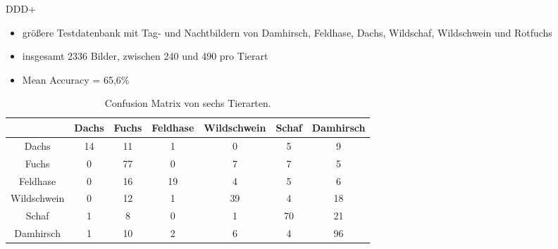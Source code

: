 \begin{frame}[t, fragile]{DDD+}
	\begin{itemize}
		\item größere Testdatenbank mit Tag- und Nachtbildern von Damhirsch, Feldhase, Dachs, Wildschaf, Wildschwein und Rotfuchs
		\item insgesamt 2336 Bilder, zwischen 240 und 490 pro Tierart
		\item Mean Accuracy = 65,6\%
	\end{itemize}
			\begin{table}
				\begin{tabular}{|c|c|c|c|c|c|c|}
					\hline
					& Dachs & Fuchs & Feldhase & Wildschwein & Schaf & Damhirsch \\
					\hline
					Dachs & 14 & 11 & 1 & 0 & 5 & 9 \\ \hline
					Fuchs & 0 & 77 & 0 & 7 & 7 & 5 \\ \hline
					Feldhase & 0 & 16 & 19 & 4 & 5 & 6 \\ \hline
					Wildschwein & 0 & 12 & 1 & 39 & 4 & 18 \\ \hline
					Schaf & 1 & 8 & 0 & 1 & 70 & 21 \\ \hline
					Damhirsch & 1 & 10 & 2 & 6 & 4 & 96 \\
					\hline
				\end{tabular}
				\caption{Confusion Matrix von sechs Tierarten.}
			\end{table}
\end{frame}
